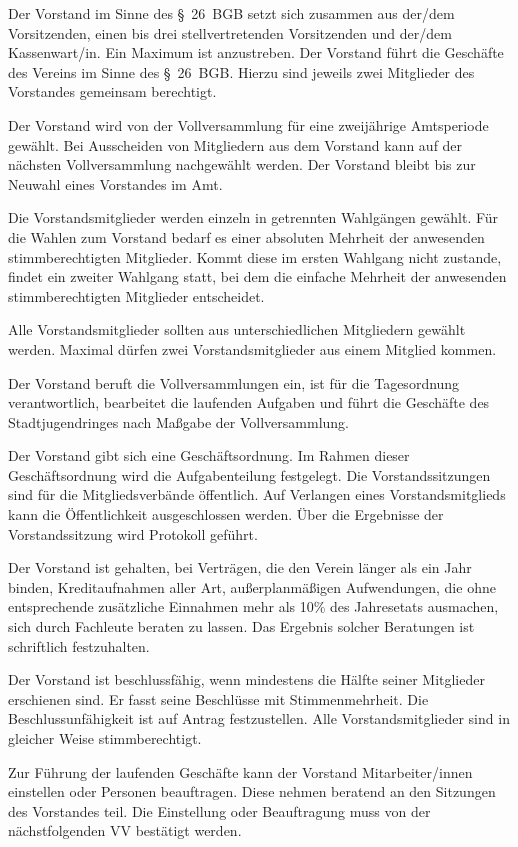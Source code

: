 \documentclass[10pt,a4paper,oneside,parskip=half]{scrartcl}
\begin{document}
\begin{contract}
Der Vorstand im Sinne des §~26~BGB setzt sich zusammen aus der/dem Vorsitzenden, einen bis drei stellvertretenden Vorsitzenden und der/dem Kassenwart/in. Ein Maximum ist anzustreben. Der Vorstand führt die Geschäfte des Vereins im Sinne des §~26~BGB. Hierzu sind jeweils zwei Mitglieder des Vorstandes gemeinsam berechtigt.

Der Vorstand wird von der Vollversammlung für eine zweijährige Amtsperiode gewählt. Bei Ausscheiden von Mitgliedern aus dem Vorstand kann auf der nächsten Vollversammlung nachgewählt werden. Der Vorstand bleibt bis zur Neuwahl eines Vorstandes im Amt.

Die Vorstandsmitglieder werden einzeln in getrennten Wahlgängen gewählt. Für die Wahlen zum Vorstand bedarf es einer absoluten Mehrheit der anwesenden stimmberechtigten Mitglieder. Kommt diese im ersten Wahlgang nicht zustande, findet ein zweiter Wahlgang statt, bei dem die einfache Mehrheit der anwesenden stimmberechtigten Mitglieder entscheidet.

Alle Vorstandsmitglieder sollten aus unterschiedlichen Mitgliedern gewählt werden. Maximal dürfen zwei Vorstandsmitglieder aus einem Mitglied kommen.

Der Vorstand beruft die Vollversammlungen ein, ist für die Tagesordnung verantwortlich, bearbeitet die laufenden Aufgaben und führt die Geschäfte des Stadtjugendringes nach Maßgabe der Vollversammlung.

Der Vorstand gibt sich eine Geschäftsordnung. Im Rahmen dieser Geschäftsordnung wird die Aufgabenteilung festgelegt. Die Vorstandssitzungen sind für die Mitgliedsverbände öffentlich. Auf Verlangen eines Vorstandsmitglieds kann die Öffentlichkeit ausgeschlossen werden. Über die Ergebnisse der Vorstandssitzung wird Protokoll geführt.

Der Vorstand ist gehalten, bei Verträgen, die den Verein länger als ein Jahr binden, Kreditaufnahmen aller Art, außerplanmäßigen Aufwendungen, die ohne entsprechende zusätzliche Einnahmen mehr als 10\% des Jahresetats ausmachen, sich durch Fachleute beraten zu lassen. Das Ergebnis solcher Beratungen ist schriftlich festzuhalten.

Der Vorstand ist beschlussfähig, wenn mindestens die Hälfte seiner Mitglieder erschienen sind. Er fasst seine Beschlüsse mit Stimmenmehrheit. Die Beschlussunfähigkeit ist auf Antrag festzustellen. Alle Vorstandsmitglieder sind in gleicher Weise stimmberechtigt.

Zur Führung der laufenden Geschäfte kann der Vorstand Mitarbeiter/innen einstellen oder Personen beauftragen. Diese nehmen beratend an den Sitzungen des Vorstandes teil. Die Einstellung oder Beauftragung muss von der nächstfolgenden VV bestätigt werden.


\end{contract}
\end{document}
